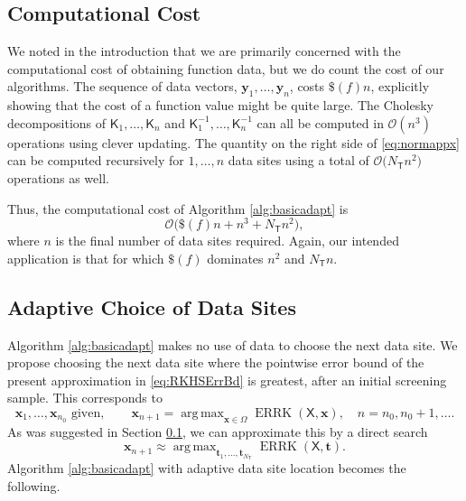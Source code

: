 \documentclass[]{mcom-l}
\theoremstyle{theorem}
\theoremstyle{remark}
\DeclareMathOperator*{\argmax}{arg\,max}
\DeclareMathOperator{\errK}{ERRK}
\newcommand{\NT}{{N_{\mT}}}
\newcommand{\mK}{\mathsf{K}}
\newcommand{\mT}{\mathsf{T}}
\newcommand{\mX}{\mathsf{X}}
\newcommand{\bx}{{\boldsymbol{x}}}
\newcommand{\by}{{\boldsymbol{y}}}
\newcommand{\bt}{{\boldsymbol{t}}}
\newcommand{\Order}{\mathcal{O}}
\begin{document}
\subsection{Computational Cost} \label{sec:compCost}
We noted in the introduction that we are primarily concerned with the computational cost of obtaining function data, but we do count the cost of our algorithms.  The sequence of data vectors, $\by_1, \ldots, \by_n$, costs $\$(f)n$, explicitly showing that the cost of a function value might be quite large.  The Cholesky decompositions of $\mK_1, \ldots, \mK_n$ and $\mK_1^{-1}, \ldots, \mK_n^{-1}$ can all be computed in $\Order(n^3)$ operations using clever updating.  The quantity on the right side of \eqref{eq:normappx} can be computed recursively for $1, \ldots, n$ data sites using a total of $\Order\bigl( \NT n^2 \bigr)$ operations as well.  

Thus, the computational cost of Algorithm \ref{alg:basicadapt} is
\begin{equation} \label{eq:compcostbasic}
\Order\bigl(\$(f)n + n^3 + \NT n^2 \bigr),
\end{equation}
where $n$ is the final number of data sites required.  Again, our intended application is that for which $\$(f)$ dominates $n^2$ and $\NT n$.  



\subsection{Adaptive Choice of Data Sites }  \label{sec:adaptSites}

Algorithm \ref{alg:basicadapt} makes no use of data to choose the next data site.  We propose choosing  the next data site where the pointwise error bound of the present approximation in \eqref{eq:RKHSErrBd} is greatest, after an initial screening sample.  This corresponds to 
\begin{equation}  \label{eq:nextsample}
\bx_1, \ldots, \bx_{n_0}\text{ given}, \qquad
 \bx_{n+1} = \argmax_{\bx \in \Omega}\errK(\mX,\bx), \quad n = n_0, n_0+1, \ldots.
\end{equation}
As was suggested in Section \ref{sec:compCost}, we can approximate this by a direct search
\begin{equation} \label{eq:nextsampleAPPX}
\bx_{n+1} \approx \argmax_{\bt_1, \ldots, \bt_\NT} \errK(\mX,\bt).
\end{equation}
Algorithm \ref{alg:basicadapt} with adaptive data site location becomes the following. 
\end{document}
